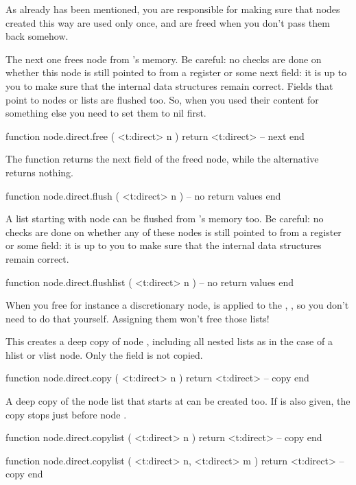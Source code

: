 As already has been mentioned, you are responsible for making sure that nodes
created this way are used only once, and are freed when you don't pass them
back somehow.

The next one frees node  from \TEX's memory. Be careful: no checks are
done on whether this node is still pointed to from a register or some \type
{next} field: it is up to you to make sure that the internal data structures
remain correct. Fields that point to nodes or lists are flushed too. So, when
you used their content for something else you need to set them to nil first.

\starttyping[option=LUA]
function node.direct.free ( <t:direct> n )
    return <t:direct> -- next
end
\stoptyping

The  function returns the next field of the freed node, while the
 alternative returns nothing.

\starttyping[option=LUA]
function node.direct.flush ( <t:direct> n )
    -- no return values
end
\stoptyping

A list starting with node  can be flushed from \TEX's memory too. Be
careful: no checks are done on whether any of these nodes is still pointed to
from a register or some  field: it is up to you to make sure that the
internal data structures remain correct.

\starttyping[option=LUA]
function node.direct.flushlist ( <t:direct> n )
    -- no return values
end
\stoptyping

When you free for instance a discretionary node,  is applied to
the , ,  so you don't need to do that
yourself. Assigning them  won't free those lists!

This creates a deep copy of node , including all nested lists as in the case
of a hlist or vlist node. Only the  field is not copied.

\starttyping[option=LUA]
function node.direct.copy ( <t:direct> n )
    return <t:direct> -- copy
end
\stoptyping

A deep copy of the node list that starts at  can be created too. If
 is also given, the copy stops just before node .

\starttyping[option=LUA]
function node.direct.copylist ( <t:direct> n )
    return <t:direct> -- copy
end

function node.direct.copylist ( <t:direct> n, <t:direct> m )
    return <t:direct> -- copy
end
\stoptyping

